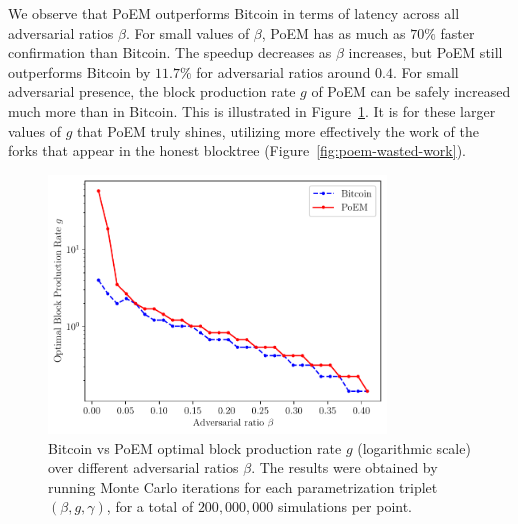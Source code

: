 We observe that PoEM outperforms Bitcoin in terms of latency across all adversarial ratios $\beta$.
For small values of $\beta$, PoEM has as much as $70\%$ faster confirmation than Bitcoin.
The speedup decreases as $\beta$ increases, but PoEM still outperforms Bitcoin by $11.7\%$ for adversarial ratios around $0.4$.
For small adversarial presence, the block production rate $g$ of PoEM can be safely increased much more than in Bitcoin.
This is illustrated in Figure~\ref{fig:g}.
It is for these larger values of $g$ that PoEM truly shines, utilizing more effectively the work of the
forks that appear in the honest blocktree (Figure~\ref{fig:poem-wasted-work}).

\begin{figure}[h]
    \centering
    \includegraphics[width = 0.8\textwidth]{figures/optimal_g.pdf}

    \caption{Bitcoin vs PoEM optimal block production rate $g$ (logarithmic scale) over different adversarial ratios $\beta$.
             The results were obtained by running \montecarlo{} Monte Carlo iterations for each parametrization triplet
             $(\beta, g, \gamma)$, for a total of $200{,}000{,}000$ simulations per point.}
    \label{fig:g}
\end{figure}

